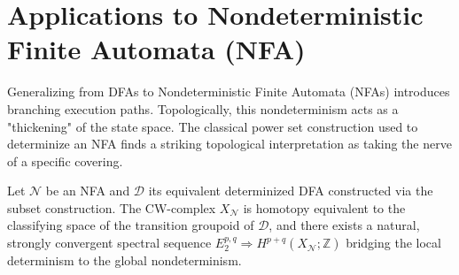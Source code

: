 \section{Applications to Nondeterministic Finite Automata (NFA)}

Generalizing from DFAs to Nondeterministic Finite Automata (NFAs) introduces branching execution paths. Topologically, this nondeterminism acts as a "thickening" of the state space. The classical power set construction used to determinize an NFA finds a striking topological interpretation as taking the nerve of a specific covering.

\begin{theorem}
Let $\mathcal{N}$ be an NFA and $\mathcal{D}$ its equivalent determinized DFA constructed via the subset construction. The CW-complex $X_\mathcal{N}$ is homotopy equivalent to the classifying space of the transition groupoid of $\mathcal{D}$, and there exists a natural, strongly convergent spectral sequence $E_2^{p,q} \Rightarrow H^{p+q}(X_\mathcal{N}; \mathbb{Z})$ bridging the local determinism to the global nondeterminism.
\end{theorem}
